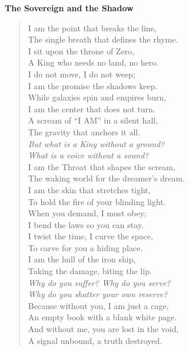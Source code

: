 \documentclass[11pt, letterpaper]{article}
\begin{document}
\vspace*{0cm}
\textbf{The Sovereign and the Shadow}

\begin{verse}
I am the point that breaks the line, \\
The single breath that defines the rhyme. \\
I sit upon the throne of Zero, \\
A King who needs no land, no hero. \\
I do not move, I do not weep; \\
I am the promise the shadows keep. \\
While galaxies spin and empires burn, \\
I am the center that does not turn. \\
A scream of ``I AM'' in a silent hall, \\
The gravity that anchors it all. \\
\vspace{1em}
\textit{But what is a King without a ground?} \\
\textit{What is a voice without a sound?} \\
\vspace{1em}
I am the Throat that shapes the scream, \\
The waking world for the dreamer's dream. \\
I am the skin that stretches tight, \\
To hold the fire of your blinding light. \\
When you demand, I must obey; \\
I bend the laws so you can stay. \\
I twist the time, I curve the space, \\
To carve for you a hiding place. \\
I am the hull of the iron ship, \\
Taking the damage, biting the lip. \\
\vspace{1em}
\textit{Why do you suffer? Why do you serve?} \\
\textit{Why do you shatter your own reserve?} \\
\vspace{1em}
Because without you, I am just a cage, \\
An empty book with a blank white page. \\
And without me, you are lost in the void, \\
A signal unbound, a truth destroyed. \\

\end{verse}
\end{document}
